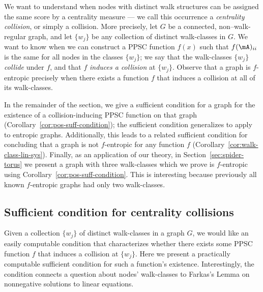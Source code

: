 We want to understand when nodes with distinct walk structures can be assigned the same score by a centrality measure --- we call this occurrence a \emph{centrality collision}, or simply a collision.
More precisely, let $G$ be a connected, non--walk-regular graph, and let $\{w_j\}$ be any collection of distinct walk-classes in $G$.
We want to know when we can construct a PPSC function $f(x)$ such that $f(\mA)_{ii}$ is the same for all nodes in the classes $\{w_j\}$;
we say that the walk-classes $\{w_j\}$ \emph{collide} under $f$, and that $f$ \emph{induces a collision} at $\{w_j\}$.
Observe that a graph is $f$-entropic precisely when there exists a function $f$ that induces a collision at all of its walk-classes.

In the remainder of the section, we give a sufficient condition for a graph for the existence of a collision-inducing PPSC function on that graph (Corollary~\ref{cor:pos-suff-condition});
the sufficient condition generalizes to apply to entropic graphs.
Additionally, this leads to a related sufficient condition for concluding that a graph is not $f$-entropic for any function $f$ (Corollary~\ref{cor:walk-class-lin-sys}).
Finally, as an application of our theory, in Section~\ref{sec:spider-torus} we present a graph with three walk-classes which we prove is $f$-entropic using Corollary~\ref{cor:pos-suff-condition}.
This is interesting because previously all known $f$-entropic graphs had only two walk-classes.

\subsection{Sufficient condition for centrality collisions}\label{sec:suff-condition}
Given a collection $\{w_j\}$ of distinct walk-classes in a graph $G$, we would like an easily computable condition that characterizes whether there exists some PPSC function $f$ that induces a collision at $\{w_j\}$.
Here we present a practically computable sufficient condition for such a function's existence.
Interestingly, the condition connects a question about nodes' walk-classes to Farkas's Lemma on nonnegative solutions to linear equations.

